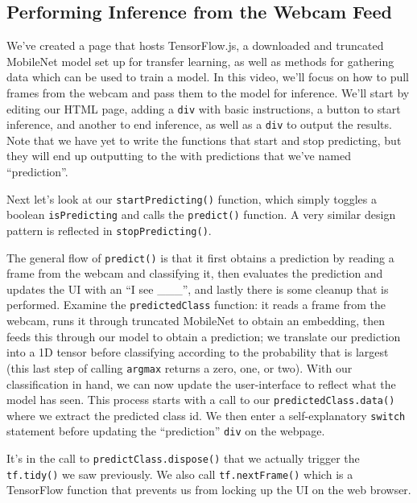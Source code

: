 \documentclass[12pt]{article}
\begin{document}
\subsection{Performing Inference from the Webcam Feed}
We've created a page that hosts TensorFlow.js, a downloaded and truncated MobileNet
model set up for transfer learning, as well as methods for gathering data which can be used
to train a model. In this video, we'll focus on how to pull frames from the webcam and pass
them to the model for inference. We'll start by editing our HTML page, adding a \texttt{div}
with basic instructions, a button to start inference, and another to end inference, as well
as a \texttt{div} to output the results. Note that we have yet to write the functions that start and stop predicting,
but they will end up outputting to the  with predictions that we've named ``prediction''.


Next let's look at our \texttt{startPredicting()} function, which simply toggles a boolean \texttt{isPredicting}
and calls the \texttt{predict()} function. A very similar design pattern is reflected in \texttt{stopPredicting()}.


The general flow of \texttt{predict()} is that it first obtains a prediction by reading a frame from the
webcam and classifying it, then evaluates the prediction and updates the UI with an ``I see \_\_\_'',
and lastly there is some cleanup that is performed. Examine the \texttt{predictedClass} function: it reads a frame from
the webcam, runs it through truncated MobileNet to obtain an embedding, then feeds this through our model to obtain a prediction;
we translate our prediction into a 1D tensor before classifying according to the probability that is largest (this last step of calling \texttt{argmax} returns a zero, one, or two). With our classification in hand, we can now update the user-interface to reflect
what the model has seen. This process starts with a call to our \texttt{predictedClass.data()} where we extract the predicted
class id. We then enter a self-explanatory \texttt{switch} statement before updating the ``prediction'' \texttt{div} on the webpage.

It's in the call to \texttt{predictClass.dispose()} that we actually trigger the \texttt{tf.tidy()} we saw previously. We also call
\texttt{tf.nextFrame()} which is a TensorFlow function that prevents us from locking up the UI on the web browser.
\end{document}
